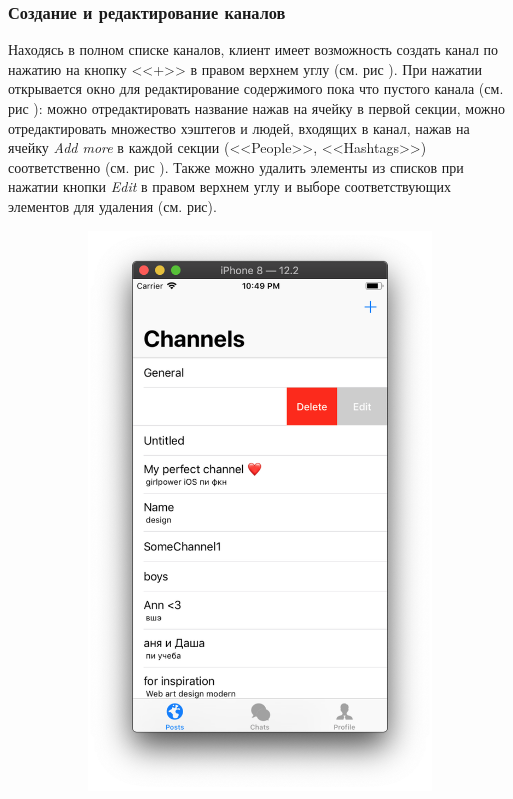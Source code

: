 \documentclass[a4paper,12pt]{article}
\begin{document}
	\subsubsection{Создание и редактирование каналов}
	Находясь в полном списке каналов, клиент имеет возможность создать канал по нажатию на кнопку <<+>> в правом верхнем углу (см. рис ). При нажатии открывается окно для редактирование содержимого пока что пустого канала (см. рис ): можно отредактировать название нажав на ячейку в первой секции, можно отредактировать множество хэштегов и людей, входящих в канал, нажав на ячейку \textit{Add more} в каждой секции (<<People>>, <<Hashtags>>) соответственно (см. рис ). Также можно удалить элементы из списков при нажатии кнопки \textit{Edit} в правом верхнем углу и выборе соответствующих элементов для удаления (см. рис). 
	\begin{figure}[h!]
		\centering
		\begin{subfigure}[b]{0.3\linewidth}
			\includegraphics[width=\linewidth]{../includes/pmi/edit.png}

\end{subfigure}
\end{figure}
\end{document}
